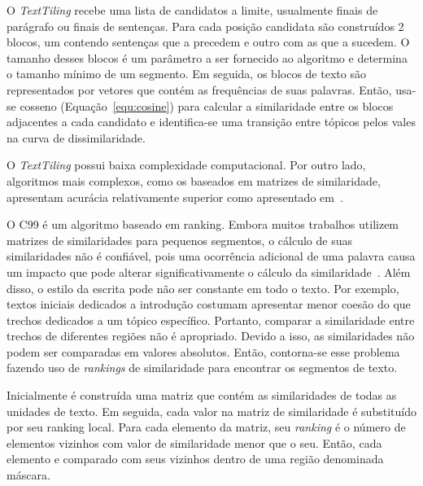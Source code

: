 O \textit{TextTiling} recebe uma lista de candidatos a limite, usualmente finais de parágrafo ou finais de sentenças. Para cada posição candidata são construídos 2 blocos, um contendo sentenças que a precedem e outro com as que a sucedem. O tamanho desses blocos é um parâmetro a ser fornecido ao algoritmo e determina o tamanho mínimo de um segmento.
%
Em seguida, os blocos de texto são representados por vetores que contém as frequências de suas palavras. Então, usa-se cosseno (Equação~\ref{equ:cosine}) para calcular a similaridade entre os blocos adjacentes a cada candidato e identifica-se uma transição entre tópicos pelos vales na curva de dissimilaridade.



O \textit{TextTiling} possui baixa complexidade computacional. Por outro lado, algoritmos mais complexos, como os baseados em matrizes de similaridade, apresentam acurácia relativamente superior como apresentado em~\cite{Choi2000, Kern2009, Misra2009}.


O C99 é um algoritmo baseado em ranking.
%
Embora muitos trabalhos utilizem matrizes de similaridades para pequenos segmentos, o cálculo de suas similaridades não é confiável, pois uma ocorrência adicional de uma palavra causa um impacto que pode alterar significativamente o cálculo da similaridade~\cite{Choi2000}.
%
Além disso, o estilo da escrita pode não ser constante em todo o texto. Por exemplo, textos iniciais dedicados a introdução costumam apresentar menor coesão do que trechos dedicados a um tópico específico. Portanto, comparar a similaridade entre trechos de diferentes regiões não é apropriado.
Devido a isso, as similaridades não podem ser comparadas em valores absolutos. Então, contorna-se esse problema fazendo uso de \textit{rankings} de similaridade para encontrar os segmentos de texto. 


Inicialmente é construída uma matriz que contém as similaridades de todas as unidades de texto. Em seguida, cada valor na matriz de similaridade é substituído por seu ranking local. Para cada elemento da matriz, seu \textit{ranking} é o número de elementos vizinhos com valor de similaridade menor que o seu.
Então, cada elemento e comparado com seus vizinhos dentro de uma região denominada máscara.
%


